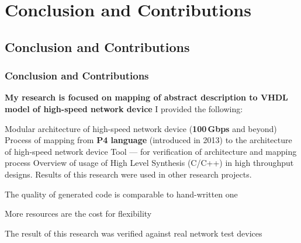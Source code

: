 \section{Conclusion and Contributions}
\subsection*{Conclusion and Contributions}
\begin{frame}
    \frametitle{Conclusion and Contributions}
    \begin{itemize}
        \fitem \textbf{My research is focused on mapping of abstract description to VHDL model of high-speed network device}
        \fitem I provided the following:
        \begin{enumerate}
            \fitem Modular architecture of high-speed network device (\textbf{100\,Gbps} and beyond)
            \fitem Process of mapping from \textbf{P4 language} (introduced in 2013) to the architecture of high-speed network device
            \fitem Tool --- for verification of architecture and mapping process
            \fitem Overview of usage of High Level Synthesis (C/C++) in high throughput designs. 
            Results of this research were used in other research projects. 
        \end{enumerate}
        \fitem The quality of generated code is comparable to hand-written one
        \begin{itemize}
            \fitem More resources are the cost for flexibility
        \end{itemize}
        \fitem The result of this research was verified against real network test devices
    \end{itemize}
\end{frame}

